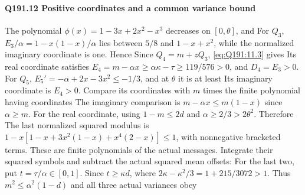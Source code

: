 \paragraph{Q191.12 Positive coordinates and a common variance bound}\label{part:Q191.12}
The polynomial $\phi(x)=\allowbreak 1-3x+2x^2-x^3$ decreases on $[0,\allowbreak \theta]$, and
For $Q_3$, $E_3/\alpha=\allowbreak 1-x(1-x)/\alpha$ lies between $5/8$ and
$1-x+x^2$, while the normalized imaginary coordinate is one. Hence
Since $Q_4=\allowbreak m+zQ_3$, \eqref{eq:Q191:11.3} gives
Its real coordinate satisfies
$E_4=\allowbreak m-\alpha x\ge\allowbreak \alpha\kappa-\tau\ge\allowbreak 119/576>\allowbreak 0$, and $D_4=\allowbreak E_3>\allowbreak 0$.
For $Q_5$, $E_5'=\allowbreak -\alpha+2x-3x^2\le\allowbreak -1/3$, and at $\theta$ it is at least
Its imaginary coordinate is $E_4>\allowbreak 0$. Compare its coordinates with $m$
times the finite polynomial having coordinates
The imaginary comparison is $m-\alpha x\le\allowbreak  m(1-x)$ since $\alpha\ge\allowbreak  m$.
For the real coordinate,
using $1-m\le\allowbreak 2d$ and $\alpha\ge\allowbreak 2/3>\allowbreak 2\theta^2$. Therefore
The last normalized squared modulus is
$1-x[1-x+3x^2(1-x)+x^4(2-x)]\le\allowbreak 1$, with nonnegative bracketed terms.
These are finite polynomials of the actual messages.
Integrate their squared symbols and subtract the actual squared mean offsets:
For the last two, put $t=\allowbreak \tau/\alpha\in[0,\allowbreak 1]$. Since $t\ge\allowbreak \kappa d$,
where $2\kappa-\kappa^2/3=\allowbreak 1+215/3072>\allowbreak 1$. Thus
$m^2\le\allowbreak \alpha^2(1-d)$ and all three actual variances obey

